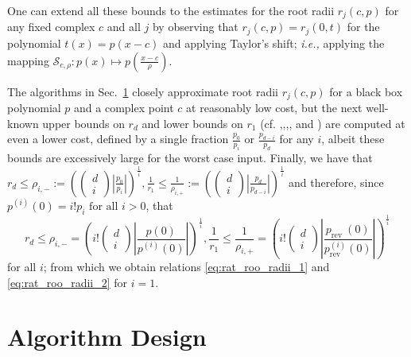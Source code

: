 \documentclass[sigconf]{acmart}
\begin{document}

One can extend all these bounds to the estimates for the root radii $r_{j}(c, p)$ for any fixed complex $c$ and all $j$ by observing that $r_{j}(c, p)=r_{j}(0, t)$ for the polynomial $t(x)=p(x-c)$ and applying Taylor's shift; \emph{i.e.,} applying the mapping $\mathcal{S}_{c ,\rho }:p(x) \mapsto p\left( \frac{x - c}{\rho} \right)$.

The algorithms in Sec.~\ref{sec:alg_des} closely approximate root radii $r_{j}(c, p)$ for a black box polynomial $p$ and a complex point $c$ at reasonably low cost, but the next well-known upper bounds on $r_{d}$ and lower bounds on $r_{1}$ (cf. \cite{kerimov1977applied},\cite{carstensen1991inclusion},\cite{pan2000approximating},\cite{bini2000design}, and \cite{bini2014solving}) are computed at even a lower cost, defined by a single fraction $\frac{p_{0}}{p_{i}}$ or $\frac{p_{d-i}}{p_{d}}$ for any $i$, albeit these bounds are excessively large for the worst case input.
Finally, we have that
$r_{d} \leq \rho_{i,-}:=\left(\left(\begin{array}{c}d \\ i\end{array}\right)\left|\frac{p_{0}}{p_{i}}\right|\right)^{\frac{1}{i}}, \frac{1}{r_{1}} \leq \frac{1}{\rho_{i,+}}:=\left(\left(\begin{array}{l}d \\ i\end{array}\right)\left|\frac{p_{d}}{p_{d-i}}\right|\right)^{\frac{1}{i}}$
and therefore, since $p^{(i)}(0)=i ! p_{i} \text { for all } i>0$, that
\begin{equation}\label{eq:last_appen}
r_{d} \leq \rho_{i,-}=\left(i !\left(\begin{array}{c}
d \\
i
\end{array}\right)\left|\frac{p(0)}{p^{(i)}(0)}\right|\right)^{\frac{1}{i}}, \frac{1}{r_{1}} \leq \frac{1}{\rho_{i,+}}=\left(i !\left(\begin{array}{c}
d \\
i
\end{array}\right)\left|\frac{p_{\text {rev }}(0)}{p_{\text {rev }}^{(i)}(0)}\right|\right)^{\frac{1}{i}}
\end{equation}
for all $i$; from which we obtain relations \ref{eq:rat_roo_radii_1} and \ref{eq:rat_roo_radii_2} for $i=1$.




\section{Algorithm Design}\label{sec:alg_des}
\end{document}
